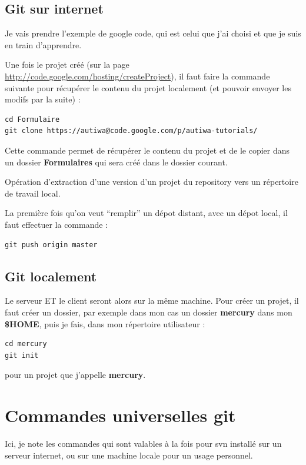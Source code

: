\documentclass[a4paper,twoside]{article}
\begin{document}
\subsection{Git sur internet}
Je vais prendre l'exemple de google code, qui est celui que j'ai choisi et que je suis en train d'apprendre.


Une fois le projet créé (sur la page \url{http://code.google.com/hosting/createProject}), il faut faire la commande suivante pour récupérer le contenu du projet localement (et pouvoir envoyer les modifs par la suite) : 
\begin{verbatim}
cd Formulaire
git clone https://autiwa@code.google.com/p/autiwa-tutorials/ 
\end{verbatim}

Cette commande permet de récupérer le contenu du projet et de le copier dans un dossier \textbf{Formulaires} qui sera créé dans le dossier courant.

\begin{definition}[Clone]
Opération d'extraction d'une version d'un projet du repository vers un répertoire de travail local.
\end{definition}

\begin{remarque}
La première fois qu'on veut ``remplir'' un dépot distant, avec un dépot local, il faut effectuer la commande : 
\begin{verbatim}
git push origin master
\end{verbatim}

\end{remarque}



\subsection{Git localement}\label{sec:git_init}
Le serveur ET le client seront alors sur la même machine. Pour créer un projet, il faut créer un dossier, par exemple dans mon cas un dossier \textbf{mercury} dans mon \textbf{\$HOME}, puis je fais, dans mon répertoire utilisateur : 
\begin{verbatim}
cd mercury
git init
\end{verbatim}
pour un projet que j'appelle \textbf{mercury}.

\section{Commandes universelles git}
Ici, je note les commandes qui sont valables à la fois pour svn installé sur un serveur internet, ou sur une machine locale pour un usage personnel.
\end{document}
